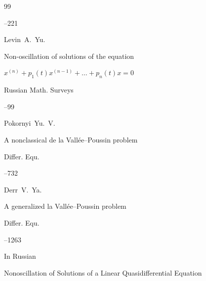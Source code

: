 \begin{thebibliography}{99}


--221






\by Levin~A.~Yu.

\paper Non-oscillation of solutions of the equation

$x^{(n)}+p_1(t)x^{(n-1)}+\dots+p_n(t)x=0$

\jour Russian Math. Surveys




--99







\by Pokornyi~Yu.~V.

\paper A nonclassical de la Vall\'ee--Poussin problem

\jour  Differ. Equ.




–732 







\by Derr~V.~Ya.

\paper A generalized la Vall\'ee--Poussin problem

\jour Differ. Equ.



--1263 









\lang In Russian

\paper Nonoscillation of Solutions of a Linear Quasidifferential Equation  


\end{thebibliography}

